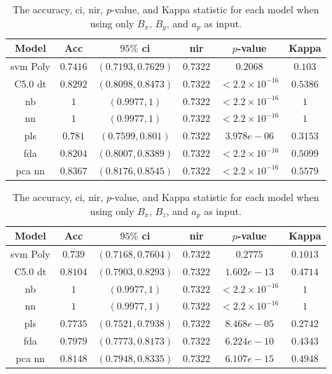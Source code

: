 \documentclass[sn-mathphys-num]{sn-jnl}%
\begin{document}
\begin{table}[!ht]
    \centering
    \caption{The accuracy, \acrshort{ci}, \acrshort{nir}, $p$-value, and Kappa statistic for each model when using only $B_{x}$, $B_{y}$, and $a_{p}$ as input.}
	\label{tab:stats:reverse:xyap}
	\begin{tabular}{|c|c|c|c|c|c|}
		\hline
		Model & Acc & $95\%$ \acrshort{ci} & \acrshort{nir} & $p$-value & Kappa \\ \hline
		\acrshort{svm} Poly & $0.7416$ & $(0.7193, 0.7629)$ & $0.7322$ & $0.2068$ & $0.103$ \\ \hline
		C5.0 \acrshort{dt} & $0.8292$ & $(0.8098, 0.8473)$ & $0.7322$ & $< 2.2 \times {10}^{-16}$ & $0.5386$ \\ \hline
		\acrshort{nb} & $1$ & $(0.9977, 1)$ & $0.7322$ & $< 2.2 \times {10}^{-16}$ & $1$ \\ \hline
		\acrshort{nn} & $1$ & $(0.9977, 1)$ & $0.7322$ & $< 2.2 \times {10}^{-16}$ & $1$ \\ \hline
		\acrshort{pls} & $0.781$ & $(0.7599, 0.801)$ & $0.7322$ & $3.978e-06$ & $0.3153$ \\ \hline
		\acrshort{fda} & $0.8204$ & $(0.8007, 0.8389)$ & $0.7322$ & $< 2.2 \times {10}^{-16}$ & $0.5099$ \\ \hline
		\acrshort{pca} \acrshort{nn} & $0.8367$ & $(0.8176, 0.8545)$ & $0.7322$ & $< 2.2 \times {10}^{-16}$ & $0.5579$ \\ \hline
	\end{tabular}
\end{table}

\begin{table}[!ht]
    \centering
    \caption{The accuracy, \acrshort{ci}, \acrshort{nir}, $p$-value, and Kappa statistic for each model when using only $B_{x}$, $B_{z}$, and $a_{p}$ as input.}
	\label{tab:stats:reverse:xzap}
	\begin{tabular}{|c|c|c|c|c|c|}
		\hline
		Model & Acc & $95\%$ \acrshort{ci} & \acrshort{nir} & $p$-value & Kappa \\ \hline
		\acrshort{svm} Poly & $0.739$ & $(0.7168, 0.7604)$ & $0.7322$ & $0.2775$ & $0.1013$ \\ \hline
		C5.0 \acrshort{dt} & $0.8104$ & $(0.7903, 0.8293)$ & $0.7322$ & $1.602e-13$ & $0.4714$ \\ \hline
		\acrshort{nb} & $1$ & $(0.9977, 1)$ & $0.7322$ & $< 2.2 \times {10}^{-16}$ & $1$ \\ \hline
		\acrshort{nn} & $1$ & $(0.9977, 1)$ & $0.7322$ & $< 2.2 \times {10}^{-16}$ & $1$ \\ \hline
		\acrshort{pls} & $0.7735$ & $(0.7521, 0.7938)$ & $0.7322$ & $8.468e-05$ & $0.2742$ \\ \hline
		\acrshort{fda} & $0.7979$ & $(0.7773, 0.8173)$ & $0.7322$ & $6.224e-10$ & $0.4343$ \\ \hline
		\acrshort{pca} \acrshort{nn} & $0.8148$ & $(0.7948, 0.8335)$ & $0.7322$ & $6.107e-15$ & $0.4948$ \\ \hline
	\end{tabular}
\end{table}
\end{document}
